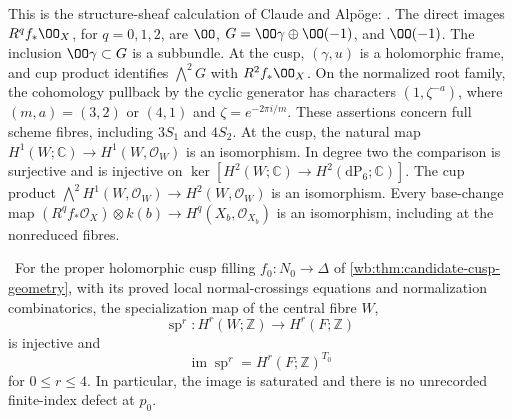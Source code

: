 
\begin{cited}\hypertarget{tag-01RQ}{}\label{inv:A1.0}\label{wb:thm:structure-direct-images-audit}\label{wb:lem:cusp-structure-sheaf-audit}


This is the structure-sheaf calculation of Claude and Alp\"oge: \cite[Lemma~9.12, pp.~72--74; Proposition~9.13, pp.~74--76, and the base-change clarification on p.~92]{AC2026}. The direct images $R^qf_*\OO_X$, for $q=0,1,2$, are
$\OO$, $G=\OO\gamma\oplus\OO(-1)$, and $\OO(-1)$.
The inclusion $\OO\gamma\subset G$ is a subbundle.  At the cusp,
$(\gamma,u)$ is a holomorphic frame, and cup product identifies
$\bigwedge^2G$ with $R^2f_*\OO_X$.  On the normalized root family, the cohomology pullback by the
cyclic generator has characters $(1,\zeta^{-a})$, where
$(m,a)=(3,2)$ or $(4,1)$ and $\zeta=e^{-2\pi i/m}$.
These assertions concern full scheme fibres, including $3S_1$ and $4S_2$.
At the cusp, the natural map $H^1(W;\mathbb C)\to H^1(W,\mathcal O_W)$ is an isomorphism. In degree two the comparison is surjective and is injective on $\ker[H^2(W;\mathbb C)\to H^2(\mathrm{dP}_6;\mathbb C)]$. The cup product $\bigwedge^2H^1(W,\mathcal O_W)\to H^2(W,\mathcal O_W)$ is an isomorphism. Every base-change map $(R^qf_*\mathcal O_X)\otimes k(b)\to H^q(X_b,\mathcal O_{X_b})$ is an isomorphism, including at the nonreduced fibres.
\end{cited}

\begin{theorem}
\label{mapsI:top:thm:p0-integral-specialization}
\ For the proper holomorphic cusp filling
\(f_0:N_0\to\Delta\) of \cref{wb:thm:candidate-cusp-geometry}, with its
proved local normal-crossings equations and normalization combinatorics,
the specialization map of the central fibre \(W\),
\[
 \operatorname{sp}^r:H^r(W;\mathbb Z)\longrightarrow H^r(F;\mathbb Z)
\]
is injective and
\[
 \operatorname{im}\operatorname{sp}^r
 =H^r(F;\mathbb Z)^{T_0}
\tag{IL.5.1}
\]
for \(0\le r\le4\).  In particular, the image is saturated and there is no
unrecorded finite-index defect at \(p_0\).
\end{theorem}


